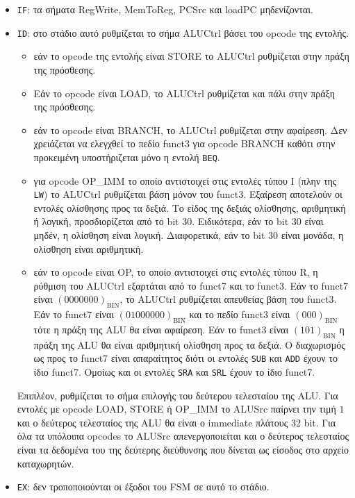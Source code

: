 \begin{itemize}
	\item \texttt{IF}: τα σήματα RegWrite, MemToReg, PCSrc και loadPC μηδενίζονται.
	\item \texttt{ID}: στο στάδιο αυτό ρυθμίζεται το σήμα ALUCtrl βάσει του opcode της εντολής. \begin{itemize}
		      \item εάν το opcode της εντολής είναι STORE το ALUCtrl ρυθμίζεται στην πράξη της πρόσθεσης.
		      \item Εάν το opcode είναι LOAD, το ALUCtrl ρυθμίζεται και πάλι στην πράξη της πρόσθεσης.
		      \item εάν το opcode είναι BRANCH, το ALUCtrl ρυθμίζεται στην αφαίρεση. Δεν χρειάζεται να ελεγχθεί το πεδίο funct3 για opcode BRANCH καθότι στην προκειμένη υποστήριζεται μόνο η εντολή \texttt{BEQ}.
		      \item για opcode OP\_IMM το οποίο αντιστοιχεί στις εντολές τύπου I (πλην της \texttt{LW}) το ALUCtrl ρυθμίζεται βάση μόνον του funct3. Εξαίρεση αποτελούν οι εντολές ολίσθησης προς τα δεξιά. Το είδος της δεξιάς ολίσθησης, αριθμητική ή λογική, προσδιορίζεται από το bit 30. Ειδικότερα, εάν το bit 30 είναι μηδέν, η ολίσθηση είναι λογική. Διαφορετικά, εάν το bit 30 είναι μονάδα, η ολίσθηση είναι αριθμητική.
		      \item εάν το opcode είναι OP, το οποίο αντιστοιχεί στις εντολές τύπου R, η ρύθμιση του ALUCtrl εξαρτάται από το funct7 και το funct3. Εάν το funct7 είναι $(0000000)_\mathrm{BIN}$, το ALUCtrl ρυθμίζεται απευθείας βάση του funct3. Εάν το funct7 είναι  $(01000000)_\mathrm{BIN}$ και το πεδίο funct3 είναι $(000)_\mathrm{BIN}$ τότε η πράξη της ALU θα είναι αφαίρεση. Εάν το funct3 είναι $(101)_\mathrm{BIN}$ η πράξη της ALU θα είναι αριθμητική ολίσθηση προς τα δεξιά. Ο διαχωρισμός ως προς το funct7 είναι απαραίτητος διότι οι εντολές \texttt{SUB} και \texttt{ADD} έχουν το ίδιο funct7. Ομοίως και οι εντολές \texttt{SRA} και \texttt{SRL} έχουν το ίδιο funct7.
	      \end{itemize} Επιπλέον, ρυθμίζεται το σήμα επιλογής του δεύτερου τελεσταίου της ALU. Για εντολές με opcode LOAD, STORE ή OP\_IMM το ALUSrc παίρνει την τιμή $1$ και ο δεύτερος τελεσταίος της ALU θα είναι ο immediate πλάτους 32 bit. Για όλα τα υπόλοιπα opcodes το ALUSrc απενεργοποιείται και ο δεύτερος τελεσταίος είναι τα δεδομένα του της δεύτερης διεύθυνσης που δίνεται ως είσοδος στο αρχείο καταχωρητών.
	\item \texttt{EX}: δεν τροποποιούνται οι έξοδοι του FSM σε αυτό το στάδιο.

\end{itemize}
